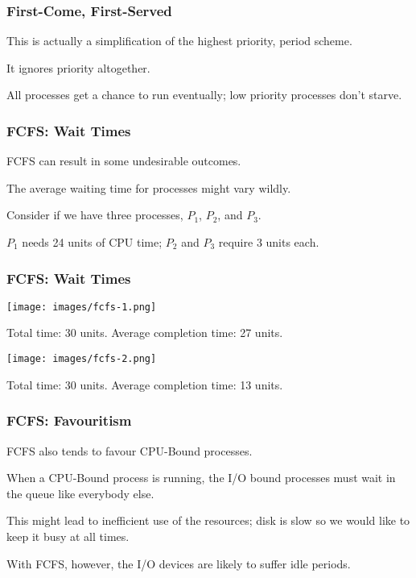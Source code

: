 \begin{frame}
\frametitle{First-Come, First-Served}

This is actually a simplification of the highest priority, period scheme.

It ignores priority altogether. 

All processes get a chance to run eventually; low priority processes don't starve.


\end{frame}

\begin{frame}
\frametitle{FCFS: Wait Times}

FCFS can result in some undesirable outcomes. 

The average waiting time for processes might vary wildly. 

Consider if we have three processes, $P_{1}$, $P_{2}$, and $P_{3}$. 

$P_{1}$ needs 24 units of CPU time; $P_{2}$ and $P_{3}$ require 3 units each.

\end{frame}

\begin{frame}
\frametitle{FCFS: Wait Times}

\begin{center}
	\texttt{[image: images/fcfs-1.png]}
\end{center}

Total time: 30 units. Average completion time: 27 units.
\begin{center}
	\texttt{[image: images/fcfs-2.png]}
\end{center}

Total time: 30 units. Average completion time: 13 units.

\end{frame}

\begin{frame}
\frametitle{FCFS: Favouritism}

FCFS also tends to favour CPU-Bound processes. 

When a CPU-Bound process is running, the I/O bound processes must wait in the queue like everybody else. 

This might lead to inefficient use of the resources; disk is slow so we would like to keep it busy at all times. 

With FCFS, however, the I/O devices are likely to suffer idle periods.

\end{frame}

